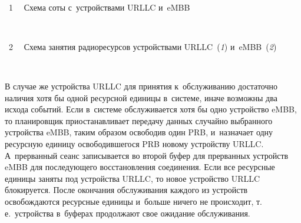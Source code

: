 \begin{multicols}{2}
{ \begin{center}  %
 \vspace*{12pt}
     \mbox{%
 \epsfxsize=78.325mm 
 }

\vspace*{6pt}

\noindent
{{\figurename~1}\ \ \small{
Схема соты с~устройствами URLLC и~\mbox{eMBB}
}}
\end{center}}

\vspace*{6pt}



{ \begin{center}  %
 \vspace*{3pt}
    \mbox{%
 \epsfxsize=79mm 
 }

\end{center}

\noindent
{{\figurename~2}\ \ \small{
Схема занятия радиоресурсов устройствами \mbox{URLLC}~(\textit{1}) и~\mbox{eMBB}~(\textit{2})
}}}


\setcounter{figure}{2}
\begin{figure*}[b] %
\vspace*{-3pt}
 \begin{center}  
 \mbox{%
 \epsfxsize=136.498mm 
 }
\end{center}
\vspace*{-9pt}
\label{fig_QS}
\end{figure*}


В случае же устройства URLLC для принятия к~обслуживанию достаточно наличия хотя бы одной ресурсной 
единицы в~системе, иначе возможны два исхода событий. Если в~системе обслуживается хотя бы одно устройство
 \mbox{eMBB}, то планировщик приостанавливает передачу данных случайно выбранного устройства \mbox{eMBB}, таким образом
  освободив один PRB, и~назначает одну ресурсную единицу освободившегося PRB новому устройству URLLC. 
  А~прерванный сеанс записывается во второй буфер для прерванных устройств \mbox{eMBB} для последующего 
  восстановления соединения. Если все ресурсные единицы заняты под устройства URLLC, то новое устройство 
  URLLC блокируется.
После окончания обслуживания каждого из устройств освобождаются ресурсные единицы и~больше ничего не 
происходит, т.\,е.\ устройства в~буферах продолжают свое ожидание обслуживания.


\end{multicols}
